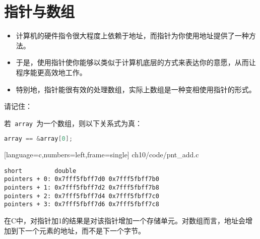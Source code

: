 \section{指针与数组}

\begin{frame}[fragile]\ft{\secname}
\begin{itemize}
\item
计算机的硬件指令很大程度上依赖于地址，而指针为你使用地址提供了一种方法。\\[0.1in]
\item
于是，使用指针使你能够以类似于计算机底层的方式来表达你的意愿，从而让程序能更高效地工作。\\[0.1in]
\item 
特别地，指针能很有效的处理数组，实际上数组是一种变相使用指针的形式。
\end{itemize}
\end{frame}


\begin{frame}[fragile]\ft{\secname}
请记住：
\pause \vspace{0.2in}

若\lstinline| array |为一个数组，则以下关系式为真：
\begin{lstlisting}[language=c,backgroundcolor=\color{red!20}]
array == &array[0];
\end{lstlisting}
\end{frame}


\begin{frame}\ft{\secname}
  
  [language=c,numbers=left,frame=single]
  {ch10/code/pnt_add.c}
\end{frame}


\begin{frame}[fragile]\ft{\secname}

\begin{lstlisting}[backgroundcolor=\color{red!20}]
                  short         double
pointers + 0: 0x7fff5fbff7d0 0x7fff5fbff7b0
pointers + 1: 0x7fff5fbff7d2 0x7fff5fbff7b8
pointers + 2: 0x7fff5fbff7d4 0x7fff5fbff7c0
pointers + 3: 0x7fff5fbff7d6 0x7fff5fbff7c8
\end{lstlisting}
\end{frame}


\begin{frame}[fragile]\ft{\secname}
在C中，对指针加1的结果是对该指针增加一个存储单元。对数组而言，地址会增加到下一个元素的地址，而不是下一个字节。
\end{frame}


